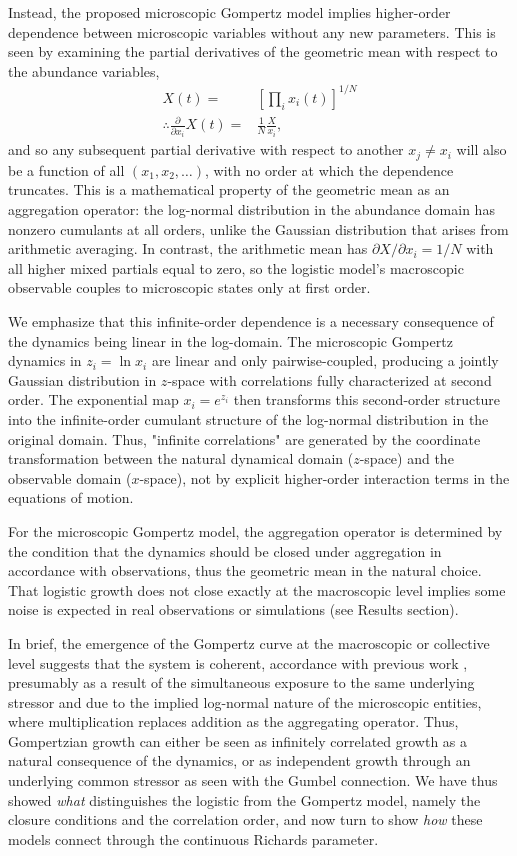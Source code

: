 \documentclass{article}
\begin{document}
Instead, the proposed microscopic Gompertz model implies higher-order dependence between microscopic variables without any new parameters. This is seen by examining the partial derivatives of the geometric mean with respect to the abundance variables,
\begin{align}
X(t) =& \left[\prod_i x_i(t)\right]^{1/N}\\
\therefore \frac{\partial}{\partial x_i}X(t) =& \frac{1}{N}\frac{X}{x_i},
\end{align}
and so any subsequent partial derivative with respect to another $x_j \neq x_i$ will also be a function of all $(x_1, x_2, \ldots)$, with no order at which the dependence truncates. This is a mathematical property of the geometric mean as an aggregation operator: the log-normal distribution in the abundance domain has nonzero cumulants at all orders, unlike the Gaussian distribution that arises from arithmetic averaging. In contrast, the arithmetic mean has $\partial X/\partial x_i = 1/N$ with all higher mixed partials equal to zero, so the logistic model's macroscopic observable couples to microscopic states only at first order.

We emphasize that this infinite-order dependence is a necessary consequence of the dynamics being linear in the log-domain. The microscopic Gompertz dynamics in $z_i = \ln x_i$ are linear and only pairwise-coupled, producing a jointly Gaussian distribution in $z$-space with correlations fully characterized at second order. The exponential map $x_i = e^{z_i}$ then transforms this second-order structure into the infinite-order cumulant structure of the log-normal distribution in the original domain. Thus, "infinite correlations" are generated by the coordinate transformation between the natural dynamical domain ($z$-space) and the observable domain ($x$-space), not by explicit higher-order interaction terms in the equations of motion.

For the microscopic Gompertz model, the aggregation operator is determined by the condition that the dynamics should be closed under aggregation in accordance with observations, thus the geometric mean in the natural choice. That logistic growth does not close exactly at the macroscopic level implies some noise is expected in real observations or simulations (see Results section). 

In brief, the emergence of the Gompertz curve at the macroscopic or collective level suggests that the system is coherent, accordance with previous work \cite{zhang1994log,petroni2020gompertz,molski2003coherent}, presumably as a result of the simultaneous exposure to the same underlying stressor and due to the implied log-normal nature of the microscopic entities, where multiplication replaces addition as the aggregating operator. Thus, Gompertzian growth can either be seen as infinitely correlated growth as a natural consequence of the dynamics, or as independent growth through an underlying common stressor as seen with the Gumbel connection. We have thus showed \emph{what} distinguishes the logistic from the Gompertz model, namely the closure conditions and the correlation order, and now turn to show \emph{how} these models connect through the continuous Richards parameter.
\end{document}
